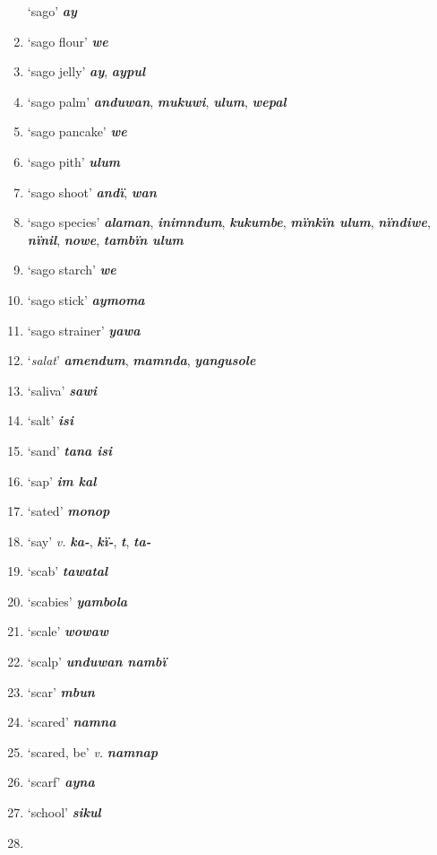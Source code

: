 \begin{enumerate}[noitemsep, label={}, align=left, widest=190, labelsep=1ex,leftmargin=*,itemindent=-10pt]
‘sago’ \textbf{\textit{ay}} \item
‘sago flour’ \textbf{\textit{we}} \item
‘sago jelly’ \textbf{\textit{ay}}, \textbf{\textit{aypul}} \item
‘sago palm’ \textbf{\textit{anduwan}}, \textbf{\textit{mukuwi}}, \textbf{\textit{ulum}}, \textbf{\textit{wepal}} \item
‘sago pancake’ \textbf{\textit{we}} \item
‘sago pith’ \textbf{\textit{ulum}} \item
‘sago shoot’ \textbf{\textit{andï}}, \textbf{\textit{wan}} \item
‘sago species’ \textbf{\textit{alaman}}, \textbf{\textit{inimndum}}, \textbf{\textit{kukumbe}}, \textbf{\textit{mïnkïn ulum}}, \textbf{\textit{nïndiwe}}, \textbf{\textit{nïnil}}, \textbf{\textit{nowe}}, \textbf{\textit{tambïn ulum}} \item
‘sago starch’ \textbf{\textit{we}} \item
‘sago stick’ \textbf{\textit{aymoma}} \item
‘sago strainer’ \textbf{\textit{yawa}} \item
‘\textit{salat}’ \textbf{\textit{amendum}}, \textbf{\textit{mamnda}}, \textbf{\textit{yangusole}} \item
‘saliva’ \textbf{\textit{sawi}} \item
‘salt’ \textbf{\textit{isi}} \item
‘sand’ \textbf{\textit{tana isi}} \item
‘sap’ \textbf{\textit{im kal}} \item
‘sated’ \textbf{\textit{monop}} \item
‘say’ \textit{v.} \textbf{\textit{ka-}}, \textbf{\textit{kï-}}, \textbf{\textit{t}}, \textbf{\textit{ta-}} \item
‘scab’ \textbf{\textit{tawatal}} \item
‘scabies’ \textbf{\textit{yambola}} \item
‘scale’ \textbf{\textit{wowaw}} \item
‘scalp’ \textbf{\textit{unduwan nambï}} \item
‘scar’ \textbf{\textit{mbun}} \item
‘scared’ \textbf{\textit{namna}} \item
‘scared, be’ \textit{v.} \textbf{\textit{namnap}} \item
‘scarf’ \textbf{\textit{ayna}} \item
‘school’ \textbf{\textit{sikul}} \item

\end{enumerate}
